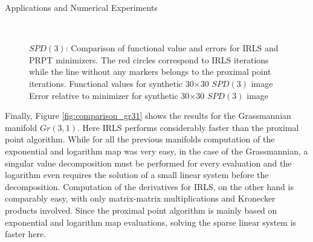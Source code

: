 \begin{chapter}{Applications and Numerical Experiments}
\begin{figure}[h!]
    \centering
    \\
    \caption[Comparison IRLS \& PRPT for $SPD(3)$]{$SPD(3)$: Comparison of functional value and errors for IRLS and PRPT minimizers.
	The red circles correspond to IRLS iterations while the line without any markers belongs to the proximal point iterations.
	 Functional values for synthetic 30$\times$30 $SPD(3)$ image
	  Error relative to minimizer for synthetic 30$\times$30 $SPD(3)$ image
	\label{fig:comparison_spd}
    }
\end{figure}

Finally, Figure \ref{fig:comparison_gr31} shows the results for the Grassmannian manifold $Gr(3,1)$.
Here IRLS performs considerably faster than the proximal point algorithm. While for all the previous
manifolds computation of the exponential and logarithm map was very easy, in the case of the Grassmannian,
a singular value decomposition must be performed for every evaluation and the logarithm even requires the solution
of a small linear system before the decomposition. Computation of the derivatives for IRLS, on the other hand is
comparably easy, with only matrix-matrix multiplications and Kronecker products involved. Since the proximal point
algorithm is mainly based on exponential and logarithm map evaluations, solving the sparse linear system is
faster here.


\end{chapter}
